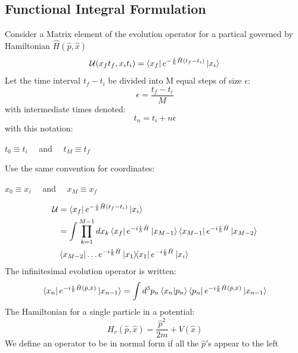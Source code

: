 \documentclass[12pt]{article}
\begin{document}
\subsection*{Functional Integral Formulation}
Consider a Matrix element of the evolution operator for a partical governed by 
Hamiltonian $\hat{H}(\hat{p},\hat{x})$
\begin{equation*}
    \mathcal{U}(x_ft_f,x_it_i)=\bra{x_f}e^{-\frac{i}{h}\hat{H}(t_f-t_i)}\ket{x_i}
\end{equation*}
Let the time interval $t_f-t_i$ be divided into M equal steps of size $\epsilon$:
\begin{equation*}
    \epsilon=\frac{t_f-t_i}{M}
\end{equation*}
with intermediate times denoted:
\begin{equation*}
    t_n=t_i+n\epsilon
\end{equation*}
with this notation:
\begin{center}
    $t_0\equiv t_i$ \ \ and \ \ $t_M\equiv t_f$
\end{center}
Use the same convention for coordinates:
\begin{center}
    $x_0\equiv x_i$ \ \ and \ \ $x_M\equiv x_f$
\end{center}
\begin{equation*}
    \begin{split}
        \mathcal{U}&=\bra{x_f}e^{-\frac{i}{h}\hat{H}(t_f-t_i)}\ket{x_i}\\
        &=\int\prod_{k=1}^{M-1}dx_k\bra{x_f}e^{-i\frac{\epsilon}{\hbar}\hat{H}}
        \ket{x_{M-1}}\bra{x_{M-1}}e^{-i\frac{\epsilon}{\hbar}\hat{H}}\ket{x_{M-2}}\\
        &\bra{{x_{M-2}}}\dots e^{-i\frac{\epsilon}{\hbar}\hat{H}}\ketbra*{x_1}{x_1}
        e^{-i\frac{\epsilon}{\hbar}\hat{H}}\ket{x_i}
    \end{split}
\end{equation*}
The infinitesimal evolution operator is written:
\begin{equation*}
    \bra{x_n}e^{-i\frac{\epsilon}{\hbar}\hat{H}(\hat{p},\hat{x})}\ket{x_{n-1}}
    =\int d^3p_n\braket*{x_n}{p_n}\bra{p_n}e^{-i\frac{\epsilon}{\hbar}
    \hat{H}(\hat{p},\hat{x})}\ket{x_{n-1}}
\end{equation*}
The Hamiltonian for a single particle in a potential:
\begin{equation*}
    H_v(\hat{p},\hat{x})=\frac{\hat{p}^2}{2m}+V(\hat{x})
\end{equation*}
We define an operator to be in normal form if all the $\hat{p}'$s appear to the left 
\end{document}
